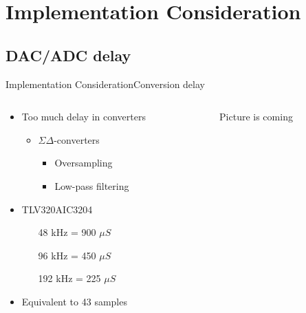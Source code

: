 \section{Implementation Consideration}
\subsection{DAC/ADC delay}
\begin{frame}{Implementation Consideration}{Conversion delay}
	\begin{columns}
		\begin{column}{0.5\textwidth}
		\begin{itemize}
		\item Too much delay in converters
				\begin{itemize}
				\item $\Sigma \Delta$-converters
				\begin{itemize}
				\item Oversampling
				\item Low-pass filtering
				\end{itemize}								
				\end{itemize}
		\item TLV320AIC3204
				\begin{itemize}
				\item[48 kHz]= 900 $\mu S$
				\item[96 kHz]= 450 $\mu S$
				\item[192 kHz]= 225 $\mu S$
				\end{itemize}			 
		\item Equivalent to 43 samples
		\end{itemize}
		\end{column}
		\begin{column}{0.5\textwidth} 
		\begin{center}
		Picture is coming
		\end{center}
		\end{column}
	\end{columns}

\end{frame}
